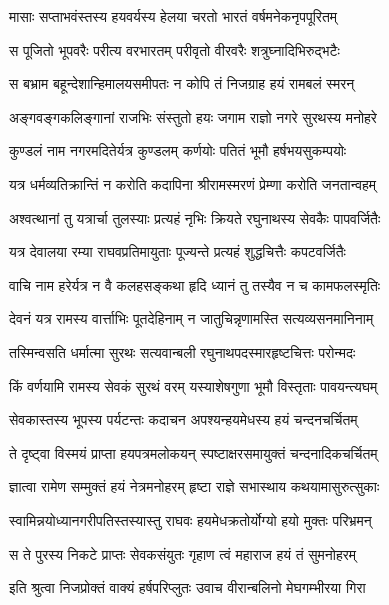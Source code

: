 \twolineshloka
{मासाः सप्ताभवंस्तस्य हयवर्यस्य हेलया}
{चरतो भारतं वर्षमनेकनृपपूरितम्}%

\twolineshloka
{स पूजितो भूपवरैः परीत्य वरभारतम्}
{परीवृतो वीरवरैः शत्रुघ्नादिभिरुद्भटैः}%

\twolineshloka
{स बभ्राम बहून्देशान्हिमालयसमीपतः}
{न कोपि तं निजग्राह हयं रामबलं स्मरन्}%

\twolineshloka
{अङ्गवङ्गकलिङ्गानां राजभिः संस्तुतो हयः}
{जगाम राज्ञो नगरे सुरथस्य मनोहरे}%

\twolineshloka
{कुण्डलं नाम नगरमदितेर्यत्र कुण्डलम्}
{कर्णयोः पतितं भूमौ हर्षभयसुकम्पयोः}%

\twolineshloka
{यत्र धर्मव्यतिक्रान्तिं न करोति कदापिना}
{श्रीरामस्मरणं प्रेम्णा करोति जनतान्वहम्}%

\twolineshloka
{अश्वत्थानां तु यत्रार्चा तुलस्याः प्रत्यहं नृभिः}
{क्रियते रघुनाथस्य सेवकैः पापवर्जितैः}%

\twolineshloka
{यत्र देवालया रम्या राघवप्रतिमायुताः}
{पूज्यन्ते प्रत्यहं शुद्धचित्तैः कपटवर्जितैः}%

\twolineshloka
{वाचि नाम हरेर्यत्र न वै कलहसङ्कथा}
{हृदि ध्यानं तु तस्यैव न च कामफलस्मृतिः}%

\twolineshloka
{देवनं यत्र रामस्य वार्त्ताभिः पूतदेहिनाम्}
{न जातुचिन्नृणामस्ति सत्यव्यसनमानिनाम्}%

\twolineshloka
{तस्मिन्वसति धर्मात्मा सुरथः सत्यवान्बली}
{रघुनाथपदस्मारहृष्टचित्तः परोन्मदः}%

\twolineshloka
{किं वर्णयामि रामस्य सेवकं सुरथं वरम्}
{यस्याशेषगुणा भूमौ विस्तृताः पावयन्त्यघम्}%

\twolineshloka
{सेवकास्तस्य भूपस्य पर्यटन्तः कदाचन}
{अपश्यन्हयमेधस्य हयं चन्दनचर्चितम्}%

\twolineshloka
{ते दृष्ट्वा विस्मयं प्राप्ता हयपत्रमलोकयन्}
{स्पष्टाक्षरसमायुक्तं चन्दनादिकचर्चितम्}%

\twolineshloka
{ज्ञात्वा रामेण सम्मुक्तं हयं नेत्रमनोहरम्}
{हृष्टा राज्ञे सभास्थाय कथयामासुरुत्सुकाः}%

\twolineshloka
{स्वामिन्नयोध्यानगरीपतिस्तस्यास्तु राघवः}
{हयमेधक्रतोर्योग्यो हयो मुक्तः परिभ्रमन्}%

\twolineshloka
{स ते पुरस्य निकटे प्राप्तः सेवकसंयुतः}
{गृहाण त्वं महाराज हयं तं सुमनोहरम्}%


\twolineshloka
{इति श्रुत्वा निजप्रोक्तं वाक्यं हर्षपरिप्लुतः}
{उवाच वीरान्बलिनो मेघगम्भीरया गिरा}%


